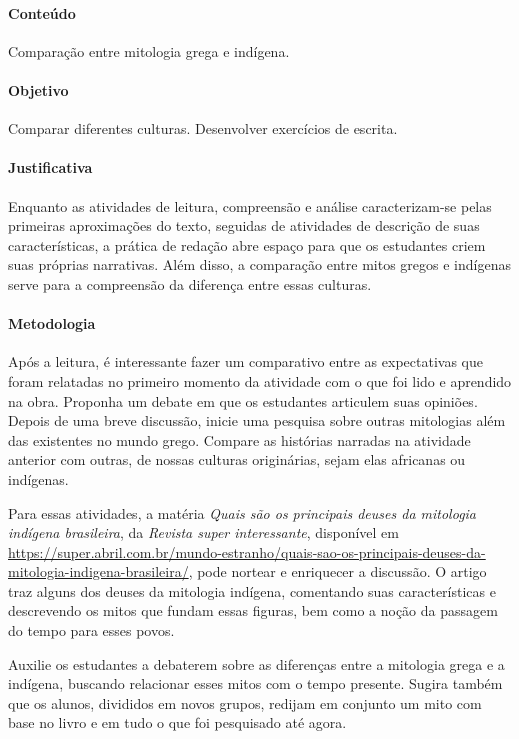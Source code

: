 \documentclass[11pt]{extarticle}
\begin{document}
\paragraph{Conteúdo} Comparação entre mitologia grega e indígena.

\paragraph{Objetivo} Comparar diferentes culturas. Desenvolver exercícios de escrita.

\paragraph{Justificativa} Enquanto as atividades de leitura, compreensão e análise caracterizam-se pelas primeiras aproximações do texto, seguidas de atividades de descrição de suas características, a prática de redação abre espaço para que os estudantes criem suas próprias narrativas. Além disso, a comparação entre mitos gregos e indígenas serve para a compreensão da diferença entre essas culturas. 

\paragraph{Metodologia} Após a leitura, é interessante fazer um comparativo entre as expectativas que foram relatadas no primeiro momento da atividade com o que foi lido e aprendido na obra. Proponha um debate em que os estudantes articulem suas opiniões. Depois de uma breve discussão, inicie uma pesquisa sobre outras mitologias além das existentes no mundo grego. Compare as histórias narradas na atividade anterior com outras, de nossas culturas originárias, sejam elas africanas ou indígenas.  

Para essas atividades, a matéria \textit{Quais são os principais deuses da mitologia indígena brasileira}, da \textit{Revista super interessante}, disponível em \url{https://super.abril.com.br/mundo-estranho/quais-sao-os-principais-deuses-da-mitologia-indigena-brasileira/}, pode nortear e enriquecer a discussão. O artigo traz alguns dos deuses da mitologia indígena, comentando suas características e descrevendo os mitos que fundam essas figuras, bem como a noção da passagem do tempo para esses povos. 

Auxilie os estudantes a debaterem sobre as diferenças entre a mitologia grega e a indígena, buscando relacionar esses mitos com o tempo presente. Sugira também que os alunos, divididos em novos grupos, redijam em conjunto um mito com base no livro e em tudo o que foi pesquisado até agora. 
\end{document}

